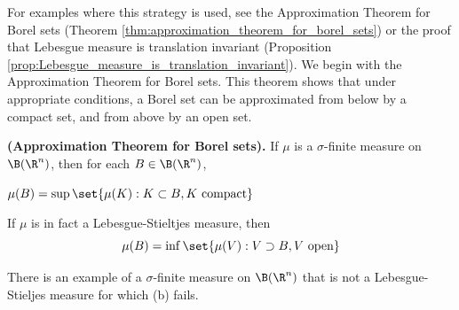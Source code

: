 \documentclass{article} %
\begin{document}
For examples where this strategy is used, see the  Approximation Theorem for Borel sets (Theorem \ref{thm:approximation_theorem_for_borel_sets}) or the proof that Lebesgue measure is translation invariant (Proposition \ref{prop:Lebesgue_measure_is_translation_invariant}). We begin with the Approximation Theorem for Borel sets.  This theorem shows that under appropriate conditions, a Borel set can be approximated from below by a compact set, and from above by an open set. 





\begin{theorem}
\textbf{(Approximation Theorem for Borel sets).} If $\mu$ is a $\sigma$-finite measure on $\B(\R^n)$, then for each $B \in \B(\R^n)$,
\begin{alphabate}
\item $\mu(B) = \sup \set{\mu(K) : K \subset B, K \text{ compact}}$
\item If $\mu$ is in fact a Lebesgue-Stieltjes measure, then
\[ \mu(B) = \inf \set{\mu(V) : V \supset B, V \text{ open}}\]
\item There is an example of a $\sigma$-finite measure on $\B(\R^n)$ that is not a Lebesgue-Stieljes measure for which (b) fails.
\end{alphabate}
\label{thm:approximation_theorem_for_borel_sets}	
\end{theorem}
\end{document}
